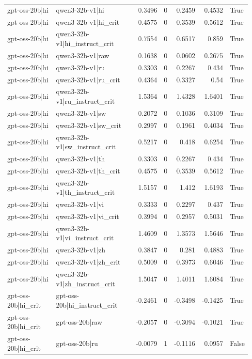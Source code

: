 \begin{table}
\begin{tabular}{l l r r r r l}
gpt-oss-20b|hi & qwen3-32b-v1|hi & 0.3496 & 0 & 0.2459 & 0.4532 & True \\
gpt-oss-20b|hi & qwen3-32b-v1|hi_crit & 0.4575 & 0 & 0.3539 & 0.5612 & True \\
gpt-oss-20b|hi & qwen3-32b-v1|hi_instruct_crit & 0.7554 & 0 & 0.6517 & 0.859 & True \\
gpt-oss-20b|hi & qwen3-32b-v1|raw & 0.1638 & 0 & 0.0602 & 0.2675 & True \\
gpt-oss-20b|hi & qwen3-32b-v1|ru & 0.3303 & 0 & 0.2267 & 0.434 & True \\
gpt-oss-20b|hi & qwen3-32b-v1|ru_crit & 0.4364 & 0 & 0.3327 & 0.54 & True \\
gpt-oss-20b|hi & qwen3-32b-v1|ru_instruct_crit & 1.5364 & 0 & 1.4328 & 1.6401 & True \\
gpt-oss-20b|hi & qwen3-32b-v1|sw & 0.2072 & 0 & 0.1036 & 0.3109 & True \\
gpt-oss-20b|hi & qwen3-32b-v1|sw_crit & 0.2997 & 0 & 0.1961 & 0.4034 & True \\
gpt-oss-20b|hi & qwen3-32b-v1|sw_instruct_crit & 0.5217 & 0 & 0.418 & 0.6254 & True \\
gpt-oss-20b|hi & qwen3-32b-v1|th & 0.3303 & 0 & 0.2267 & 0.434 & True \\
gpt-oss-20b|hi & qwen3-32b-v1|th_crit & 0.4575 & 0 & 0.3539 & 0.5612 & True \\
gpt-oss-20b|hi & qwen3-32b-v1|th_instruct_crit & 1.5157 & 0 & 1.412 & 1.6193 & True \\
gpt-oss-20b|hi & qwen3-32b-v1|vi & 0.3333 & 0 & 0.2297 & 0.437 & True \\
gpt-oss-20b|hi & qwen3-32b-v1|vi_crit & 0.3994 & 0 & 0.2957 & 0.5031 & True \\
gpt-oss-20b|hi & qwen3-32b-v1|vi_instruct_crit & 1.4609 & 0 & 1.3573 & 1.5646 & True \\
gpt-oss-20b|hi & qwen3-32b-v1|zh & 0.3847 & 0 & 0.281 & 0.4883 & True \\
gpt-oss-20b|hi & qwen3-32b-v1|zh_crit & 0.5009 & 0 & 0.3973 & 0.6046 & True \\
gpt-oss-20b|hi & qwen3-32b-v1|zh_instruct_crit & 1.5047 & 0 & 1.4011 & 1.6084 & True \\
gpt-oss-20b|hi_crit & gpt-oss-20b|hi_instruct_crit & -0.2461 & 0 & -0.3498 & -0.1425 & True \\
gpt-oss-20b|hi_crit & gpt-oss-20b|raw & -0.2057 & 0 & -0.3094 & -0.1021 & True \\
gpt-oss-20b|hi_crit & gpt-oss-20b|ru & -0.0079 & 1 & -0.1116 & 0.0957 & False \\

\end{tabular}
\end{table}
